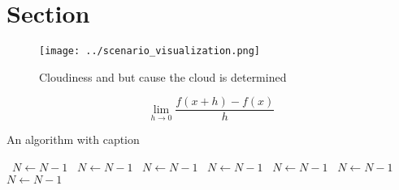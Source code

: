 \documentclass[a4paper]{article}
\begin{document}
\section{Section}

\begin{figure}
\centering
\texttt{[image: ../scenario\_visualization.png]}
\caption{Cloudiness and but cause the cloud is determined 
}
\end{figure}
 
\[\lim_{h \rightarrow 0 } \frac{f(x+h)-f(x)}{h}\]

\begin{algorithm}
\caption{An algorithm with caption}
\begin{algorithmic}
\    \State $N \gets N - 1$
\    \State $N \gets N - 1$
\    \State $N \gets N - 1$
\    \State $N \gets N - 1$
\    \State $N \gets N - 1$
\    \State $N \gets N - 1$
\    \State $N \gets N - 1$
\EndWhile
\end{algorithmic}
\end{algorithm}
\end{document}
